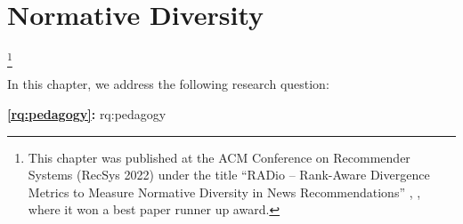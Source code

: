 
\chapter{Normative Diversity}
\label{chapter:research-radio}

\footnote[]{This chapter was published at the ACM Conference on Recommender Systems (RecSys 2022) under the title ``RADio – Rank-Aware Divergence Metrics to Measure Normative Diversity in News Recommendations'' \citep{radio}, , where it won a best paper runner up award.}
\acresetall

In this chapter, we address the following research question:

\medskip
\noindent
\textbf{\ref{rq:pedagogy}:} \acl{rq:pedagogy}
\medskip

\noindent





% 
% 
% 
% 
% 
% 
% 

